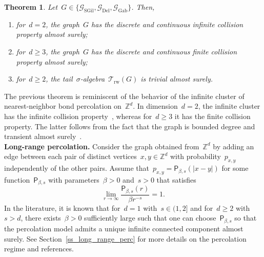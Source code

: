 \documentclass[a4paper,11pt]{article}
\newcommand{\ZZ}{\mathbb{Z}}
\newtheorem{theorem}{Theorem}
\theoremstyle{definition}
\begin{document}
\begin{theorem}\label{thm_main_dim}
Let~$G \in \{ \mathcal G_\mathrm{SGil},\mathcal G_\mathrm{Del}, \mathcal G_\mathrm{Gab} \}$. Then,
\begin{enumerate}
    \item for~$d=2$, the graph~$G$ has the discrete and continuous infinite collision property almost surely;
    \item for~$d \ge 3$, the graph~$G$ has the discrete and continuous finite collision property almost surely;
    \item for~$d \ge 2$, the tail~$\sigma$-algebra~$\mathcal T_\mathrm{rw}(G)$ is trivial almost surely. 
\end{enumerate}
\end{theorem}
The previous theorem is reminiscent of the behavior of the infinite cluster of nearest-neighbor bond percolation on~$\mathbb Z^d$. In dimension~$d=2$, the infinite cluster has the infinite collision property~\cite{BarlowPeresSousi2012,ChenChen10}, whereas for~$d \ge 3$ it has the finite collision property. The latter follows from the fact that the graph is bounded degree and transient almost surely~\cite{Grimmett93}. \\

\noindent \textbf{Long-range percolation.} Consider the graph obtained from~$\ZZ^d$ by adding an edge between each pair of distinct vertices~$x,y \in \ZZ^d$ with probability~$p_{x,y}$ independently of the other pairs. Assume that~$p_{x,y} = \mathsf P_{\beta,s}(|x-y|)$ for some function~$\mathsf P_{\beta,s}$ with parameters~$\beta > 0$ and~$s > 0$ that satisfies
$$ \lim_{r \to \infty} \frac{\mathsf P_{\beta,s}(r) }{\beta r^{-s}} = 1.$$
In the literature, it is known that for~$d=1$ with~$s\in (1,2]$ and for~$d \ge 2$ with~$s >d$, there exists~$\beta > 0$ sufficiently large such that one can choose~$\mathsf P_{\beta,s}$ so that the percolation model admits a unique infinite connected component almost surely. See Section~\ref{ss_long_range_perc} for more details on the percolation regime and references.
\end{document}
